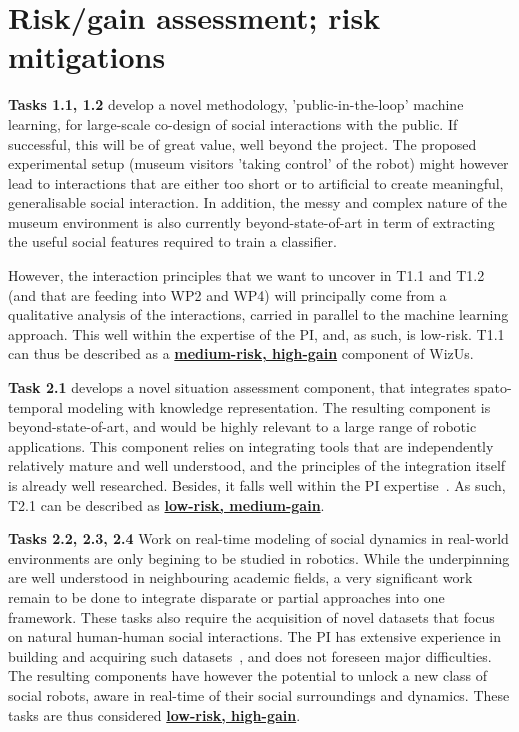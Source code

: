 \documentclass[11pt,a4paper]{report}
\newcommand{\project}{WizUs\xspace}
\begin{document}
\section{Risk/gain assessment; risk mitigations}\label{risks}

\textbf{Tasks 1.1, 1.2} develop a novel methodology, 'public-in-the-loop' machine
learning, for large-scale co-design of social interactions with the public. If
successful, this will be of great value, well beyond the project. The
proposed experimental setup (museum visitors 'taking control' of the robot)
might however lead to interactions that are either too short or to artificial to
create meaningful, generalisable social interaction. In addition, the messy and
complex nature of the museum environment is also currently beyond-state-of-art
in term of extracting the useful social features required to train a classifier.

However, the interaction principles that we want to uncover in T1.1 and T1.2
(and that are feeding into WP2 and WP4) will principally come from a qualitative
analysis of the interactions, carried in parallel to the machine learning
approach. This well within the expertise of the PI, and, as such, is low-risk.
T1.1 can thus be described as a \ul{\bf medium-risk, high-gain} component of
\project.

\vspace{1em}

\textbf{Task 2.1} develops a novel situation assessment component, that
integrates spato-temporal modeling with knowledge representation. The resulting
component is beyond-state-of-art, and would be highly relevant to a large range
of robotic applications. This component relies on integrating tools that are
independently relatively mature and well understood, and the principles of the
integration itself is already well researched. Besides, it falls well within the
PI
expertise~\cite{lemaignan2018underworlds,sallami2019simulation,lemaignan2010oro}.
As such, T2.1 can be described as \ul{\bf low-risk, medium-gain}.

\textbf{Tasks 2.2, 2.3, 2.4} Work on real-time modeling of social dynamics in
real-world environments are only begining to be studied in robotics. While the
underpinning are well understood in neighbouring academic fields, a very
significant work remain to be done to integrate disparate or partial approaches
into one framework. These tasks also require the acquisition of novel datasets
that focus on natural human-human social interactions. The PI has extensive
experience in building and acquiring such
datasets~\cite{lemaignan2018pinsoro,sallami2020unexpected}, and does not
foreseen major difficulties. The resulting components have however the potential
to unlock a new class of social robots, aware in real-time of their social
surroundings and dynamics.  These tasks are thus considered \ul{\bf low-risk,
high-gain}.
\end{document}
